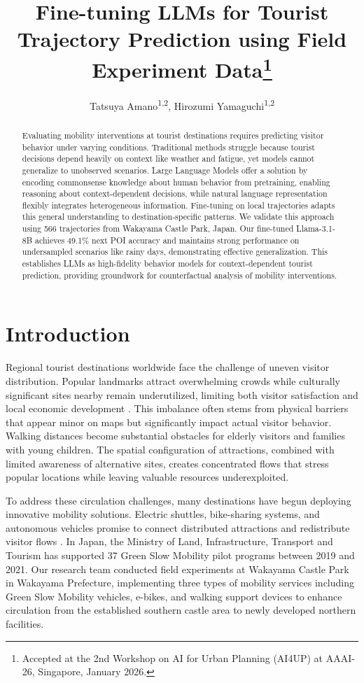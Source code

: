 \documentclass[letterpaper]{article}
\title{Fine-tuning LLMs for Tourist Trajectory Prediction using Field Experiment Data\thanks{Accepted at the 2nd Workshop on AI for Urban Planning (AI4UP) at AAAI-26, Singapore, January 2026.}}
\author{
    Tatsuya Amano\textsuperscript{\rm 1,\rm 2},
    Hirozumi Yamaguchi\textsuperscript{\rm 1,\rm 2}
}
\begin{document}
\maketitle

\begin{abstract}
Evaluating mobility interventions at tourist destinations requires predicting visitor behavior under varying conditions. Traditional methods struggle because tourist decisions depend heavily on context like weather and fatigue, yet models cannot generalize to unobserved scenarios.
Large Language Models offer a solution by encoding commonsense knowledge about human behavior from pretraining, enabling reasoning about context-dependent decisions, while natural language representation flexibly integrates heterogeneous information. Fine-tuning on local trajectories adapts this general understanding to destination-specific patterns.
We validate this approach using 566 trajectories from Wakayama Castle Park, Japan. Our fine-tuned Llama-3.1-8B achieves 49.1\% next POI accuracy and maintains strong performance on undersampled scenarios like rainy days, demonstrating effective generalization. This establishes LLMs as high-fidelity behavior models for context-dependent tourist prediction, providing groundwork for counterfactual analysis of mobility interventions.
\end{abstract}

\section{Introduction}

Regional tourist destinations worldwide face the challenge of uneven visitor distribution. Popular landmarks attract overwhelming crowds while culturally significant sites nearby remain underutilized, limiting both visitor satisfaction and local economic development \cite{UNWTO2018Overtourism}. This imbalance often stems from physical barriers that appear minor on maps but significantly impact actual visitor behavior. Walking distances become substantial obstacles for elderly visitors and families with young children. The spatial configuration of attractions, combined with limited awareness of alternative sites, creates concentrated flows that stress popular locations while leaving valuable resources underexploited.

To address these circulation challenges, many destinations have begun deploying innovative mobility solutions. Electric shuttles, bike-sharing systems, and autonomous vehicles promise to connect distributed attractions and redistribute visitor flows \cite{YANG2021104328}. In Japan, the Ministry of Land, Infrastructure, Transport and Tourism has supported 37 Green Slow Mobility pilot programs between 2019 and 2021. Our research team conducted field experiments at Wakayama Castle Park in Wakayama Prefecture, implementing three types of mobility services including Green Slow Mobility vehicles, e-bikes, and walking support devices to enhance circulation from the established southern castle area to newly developed northern facilities.
\end{document}
